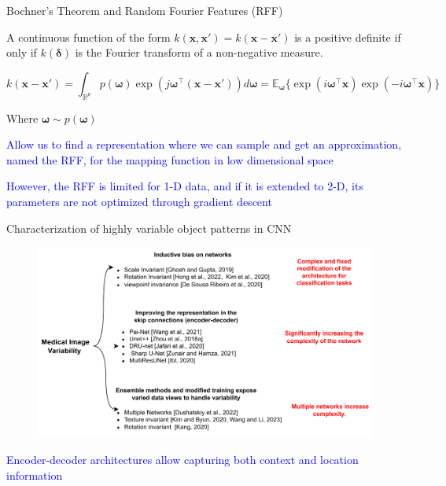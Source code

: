 \documentclass[aspectratio=169]{beamer}
\begin{document}
\begin{frame}{Bochner's Theorem and Random Fourier Features (RFF)}

A continuous function of the form $k(\mathbf{x},\mathbf{x}') = k(\mathbf{x}-\mathbf{x}')$ is a positive definite if only if $k(\mathbf{\delta})$ is the Fourier transform of a non-negative measure.

\begin{equation*}
    k(\mathbf{x}-\mathbf{x}') = \int_{\mathbb{R}^p} p(\boldsymbol{\omega}) \exp(j\boldsymbol{\omega}^\top(\mathbf{x} -\mathbf{x}')) d\boldsymbol{\omega} = \mathbb{E}_{\boldsymbol{\omega}}\big\{\exp(i \boldsymbol{\omega}^{\top}\mathbf{x}) \exp(-i \boldsymbol{\omega}^{\top}\mathbf{x})\big\}
    \label{equ:bochner}
\end{equation*}



 Where $\boldsymbol{\omega} \sim p(\boldsymbol{\omega})$

\vspace{0.9cm}


\begin{center}
    \textcolor{blue}{Allow us to find a representation where we can sample and get an approximation, named the RFF, for the mapping function in low dimensional space}
\end{center}

\begin{center}
    \textcolor{blue}{However, the RFF is limited for 1-D data, and if it is extended to 2-D, its parameters are not optimized through gradient descent}
\end{center}



\end{frame}


\begin{frame}{Characterization of
highly variable object patterns in CNN}
\begin{figure}
    \centering
    \includegraphics[width=0.75\linewidth]{Figures/State-of-the-ar-obj2.pdf}
\end{figure}    
\vspace{-0.7cm}
\begin{center}
    \textcolor{blue}{Encoder-decoder architectures allow capturing both context and location information}
\end{center}

\end{frame}
\end{document}
